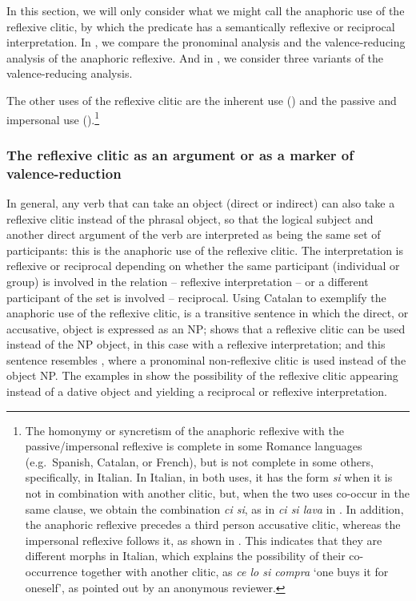 \documentclass[output=paper,hidelinks]{langscibook}
\begin{document}
In this section, we will only consider what we might call the anaphoric use of the reflexive clitic, by which the predicate has a semantically reflexive or reciprocal interpretation. In , we compare the pronominal analysis and the valence-reducing analysis of the anaphoric reflexive. And in , we consider three variants of the valence-reducing analysis. 

The other uses of the reflexive clitic are the inherent use () and the passive and impersonal use ().\footnote{The homonymy or syncretism of the anaphoric reflexive with the passive/impersonal reflexive is complete in some Romance languages (e.g.\ Spanish, Catalan, or French), but is not complete in some others, specifically, in Italian. In Italian, in both uses, it has the form \textit{si} when it is not in combination with another clitic, but, when the two uses co-occur in the same clause, we obtain the combination \textit{ci si}, as in \textit{ci si lava} in . In addition, the anaphoric reflexive precedes a third person accusative clitic, whereas the impersonal reflexive follows it, as shown in . This indicates that they are different morphs in Italian, which explains the possibility of their co-occurrence together with another clitic, as \textit{ce lo si compra} `one buys it for oneself', as pointed out by an anonymous reviewer.}

\subsubsection{The reflexive clitic as an argument or as a marker of valence-reduction}
\label{sec:Romance:2.3.1}

In general, any verb that can take an object (direct or indirect) can also take a reflexive clitic instead of the phrasal object, so that the logical subject and another direct argument of the verb are interpreted as being the same set of participants: this is the anaphoric use of the reflexive clitic. The interpretation is reflexive or reciprocal depending on whether the same participant (individual or group) is involved in the relation -- reflexive interpretation -- or a different participant of the set is involved -- reciprocal. Using Catalan to exemplify the anaphoric use of the reflexive clitic,  is a transitive sentence in which the direct, or accusative, object is expressed as an NP;  shows that a reflexive clitic can be used instead of the NP object, in this case with a reflexive interpretation; and this sentence resembles , where a pronominal non-reflexive clitic is used instead of the object NP. The examples in  show the possibility of the reflexive clitic appearing instead of a dative object and yielding a reciprocal or reflexive interpretation.
\end{document}
